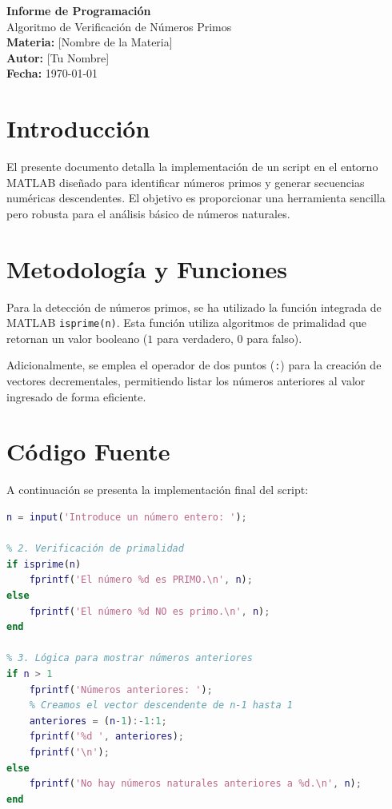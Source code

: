 \documentclass[12pt,a4paper]{article}
\begin{document}
\begin{titlepage}
    \centering
    \vspace*{2cm}
    {\Huge \textbf{Informe de Programación}} \\
    \vspace{0.5cm}
    {\Large Algoritmo de Verificación de Números Primos} \\
    \vspace{2cm}
    \textbf{Materia:} [Nombre de la Materia] \\
    \textbf{Autor:} [Tu Nombre] \\
    \vfill
    \textbf{Fecha:} \today
\end{titlepage}

\section{Introducción}
El presente documento detalla la implementación de un script en el entorno MATLAB diseñado para identificar números primos y generar secuencias numéricas descendentes. El objetivo es proporcionar una herramienta sencilla pero robusta para el análisis básico de números naturales.

\section{Metodología y Funciones}
Para la detección de números primos, se ha utilizado la función integrada de MATLAB \texttt{isprime(n)}. Esta función utiliza algoritmos de primalidad que retornan un valor booleano ($1$ para verdadero, $0$ para falso). 

Adicionalmente, se emplea el operador de dos puntos (\texttt{:}) para la creación de vectores decrementales, permitiendo listar los números anteriores al valor ingresado de forma eficiente.

\section{Código Fuente}
A continuación se presenta la implementación final del script:

\begin{lstlisting}[language=Matlab, caption=Script de detección de primos y cuenta regresiva]
% 1. Solicitar el número al usuario
n = input('Introduce un número entero: ');

% 2. Verificación de primalidad
if isprime(n)
    fprintf('El número %d es PRIMO.\n', n);
else
    fprintf('El número %d NO es primo.\n', n);
end

% 3. Lógica para mostrar números anteriores
if n > 1
    fprintf('Números anteriores: ');
    % Creamos el vector descendente de n-1 hasta 1
    anteriores = (n-1):-1:1; 
    fprintf('%d ', anteriores);
    fprintf('\n');
else
    fprintf('No hay números naturales anteriores a %d.\n', n);
end
\end{lstlisting}
\end{document}
